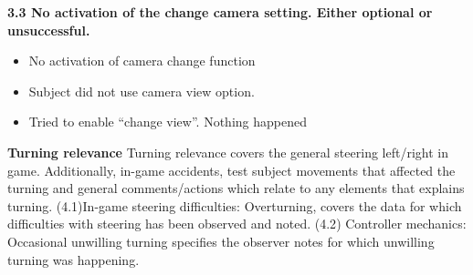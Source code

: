\noindent\textbf{3.3 No activation of the change camera setting. Either optional or unsuccessful.}
\begin{itemize}
\item No activation of camera change function
\item Subject did not use camera view option.
\item Tried to enable “change view”. Nothing happened
\end{itemize}
\bigskip

\noindent\colorbox{NotOrange}{\textbf{Turning relevance}}\newline
Turning relevance covers the general steering left/right in game. Additionally, in-game accidents, test subject movements that affected the turning and general comments/actions which relate to any elements that explains turning. ({\color{Red}4.1})In-game steering difficulties: Overturning, covers the data for which difficulties with steering has been observed and noted. ({\color{Red}4.2})  Controller mechanics: Occasional unwilling turning specifies the observer notes for which unwilling turning was happening.


